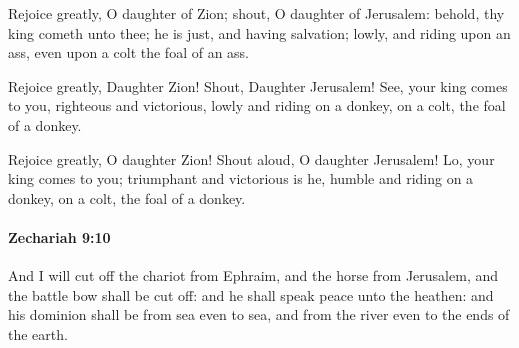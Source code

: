 			\begin{versebox}
					\item[BHS] 
					\item[LXX] 
					\item[ASV] Rejoice greatly, O daughter of Zion; shout, O daughter of Jerusalem: behold, thy king cometh unto thee; he is just, and having salvation; lowly, and riding upon an ass, even upon a colt the foal of an ass.
					\item[NIV] Rejoice greatly, Daughter Zion! Shout, Daughter Jerusalem! See, your king comes to you, righteous and victorious, lowly and riding on a donkey, on a colt, the foal of a donkey.
					\item[NRSV] Rejoice greatly, O daughter Zion! Shout aloud, O daughter Jerusalem! Lo, your king comes to you; triumphant and victorious is he, humble and riding on a donkey, on a colt, the foal of a donkey.
			\end{versebox}

		\paragraph{Zechariah 9:10} %
			\label{ZECHARIAH-9-10}

			And I will cut off the chariot from Ephraim, and the horse from Jerusalem, and the battle bow shall be cut off: and he shall speak peace unto the heathen: and his dominion shall be from sea even to sea, and from the river even to the ends of the earth.

